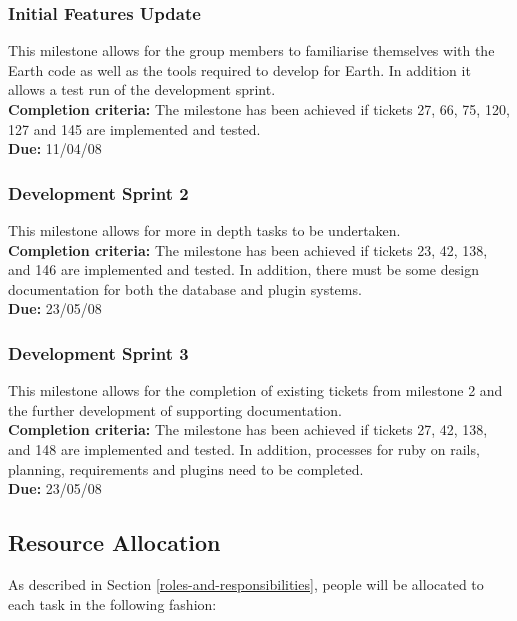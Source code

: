\documentclass{article}
\begin{document}
\subsubsection{Initial Features Update}

This milestone allows for the group members to familiarise themselves with the Earth code as well as the tools required to develop for Earth. In addition it allows a test run of the development sprint.\\
\textbf{Completion criteria:} The milestone has been achieved if tickets 27, 66, 75, 120, 127 and 145 are implemented and tested.
\\
\textbf{Due:} 11/04/08

\subsubsection{Development Sprint 2}

This milestone allows for more in depth tasks to be undertaken. \\
\textbf{Completion criteria:} The milestone has been achieved if tickets 23, 42, 138, and 146 are implemented and tested. In addition, there must be some design documentation for both the database and plugin systems.
\\
\textbf{Due:} 23/05/08

\subsubsection{Development Sprint 3}

This milestone allows for the completion of existing tickets from milestone 2 and the further development of supporting documentation. \\
\textbf{Completion criteria:} The milestone has been achieved if tickets 27, 42, 138, and 148 are implemented and tested. In addition, processes for ruby on rails, planning, requirements and plugins need to be completed.
\\
\textbf{Due:} 23/05/08

\subsection{Resource Allocation}

As described in Section \ref{roles-and-responsibilities}, people will be allocated to each task in the following fashion:
\end{document}
